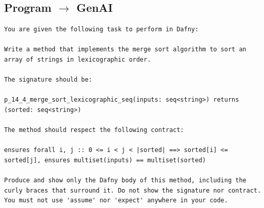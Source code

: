 \documentclass{article}
\begin{document}
\subsection*{Program $\rightarrow$ GenAI}
\begin{lstlisting}
You are given the following task to perform in Dafny:

Write a method that implements the merge sort algorithm to sort an array of strings in lexicographic order.

The signature should be:

p_14_4_merge_sort_lexicographic_seq(inputs: seq<string>) returns (sorted: seq<string>)

The method should respect the following contract:

ensures forall i, j :: 0 <= i < j < |sorted| ==> sorted[i] <= sorted[j], ensures multiset(inputs) == multiset(sorted)

Produce and show only the Dafny body of this method, including the curly braces that surround it. Do not show the signature nor contract. You must not use 'assume' nor 'expect' anywhere in your code.
\end{lstlisting}
\end{document}
